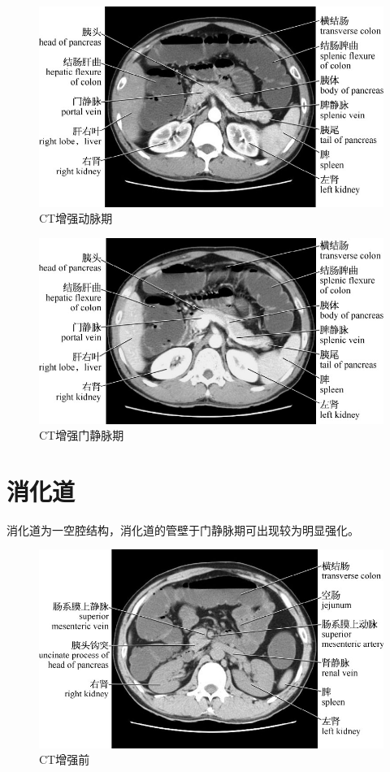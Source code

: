 \begin{figure}[!htbp]
 \centering
 \includegraphics{./images/Image00147.jpg}
 \captionsetup{justification=centering}
 \caption{CT增强动脉期}
  \end{figure} 
 \FloatBarrier

\begin{figure}[!htbp]
 \centering
 \includegraphics{./images/Image00148.jpg}
 \captionsetup{justification=centering}
 \caption{CT增强门静脉期}
  \end{figure} 
 \FloatBarrier

\section{消化道}

消化道为一空腔结构，消化道的管壁于门静脉期可出现较为明显强化。

\begin{figure}[!htbp]
 \centering
 \includegraphics{./images/Image00149.jpg}
 \captionsetup{justification=centering}
 \caption{CT增强前}
  \end{figure} 
 \FloatBarrier

